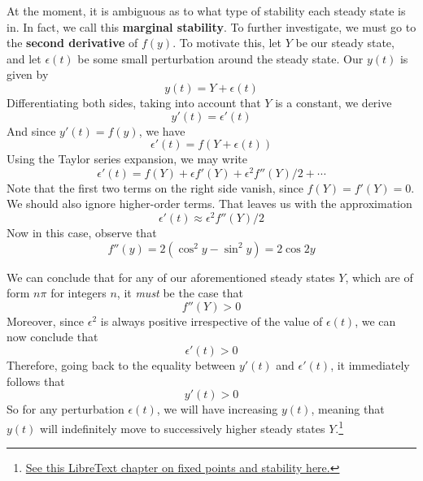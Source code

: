 \documentclass[a4paper]{article}
\begin{document}
At the moment, it is ambiguous as to what type of stability each steady state is in. In fact, we call this \textbf{marginal stability}. To further investigate, we must go to the \textbf{second derivative} of \(f \!\left( y \right) \). To motivate this, let \(Y\) be our steady state, and let \(\epsilon \!\left( t \right) \) be some small perturbation around the steady state. Our \(y \!\left( t \right) \) is given by
\[
	y \!\left( t \right) = Y + \epsilon \!\left( t \right) 
\]
Differentiating both sides, taking into account that \(Y\) is a constant, we derive
\[
	y' \!\left( t \right) = \epsilon' \!\left( t \right) 
\]
And since \(y' \!\left( t \right) = f \!\left( y \right) \), we have
\[
	\epsilon' \!\left( t \right) = f \!\left( Y + \epsilon \!\left( t \right)  \right) 
\]
Using the Taylor series expansion, we may write
\[
	\epsilon' \!\left( t \right) = f \!\left( Y \right) + \epsilon f' \!\left( Y \right) + \epsilon^{2} f'' \!\left( Y \right) / 2 + \cdots 
\]
Note that the first two terms on the right side vanish, since \(f \!\left( Y \right) = f' \!\left( Y \right) = 0\). We should also ignore higher-order terms. That leaves us with the approximation
\[
	\epsilon' \!\left( t \right) \approx \epsilon^{2} f'' \!\left( Y \right) /2
\]
Now in this case, observe that
\[
	f'' \!\left( y \right) = 2 \left( \cos^{2}y - \sin^{2}y \right) = 2 \cos 2y
\]

We can conclude that for any of our aforementioned steady states \(Y\), which are of form \(n \pi \) for integers \(n\), it \textit{must} be the case that
\[
	f''\!\left( Y \right) > 0
\]
Moreover, since \(\epsilon^{2}\) is always positive irrespective of the value of \(\epsilon \!\left( t \right) \), we can now conclude that
\[
	\epsilon' \!\left( t \right) > 0
\]
Therefore, going back to the equality between \(y'\!\left( t \right) \) and \(\epsilon' \!\left( t \right) \), it immediately follows that
\[
	y'\!\left( t \right) > 0
\]
So for any perturbation \(\epsilon \!\left( t \right) \), we will have increasing \(y \!\left( t \right) \), meaning that \(y \!\left( t \right) \) will indefinitely move to successively higher steady states \(Y\).\footnote{\href{https://math.libretexts.org/Bookshelves/Differential_Equations/Differential_Equations_(Chasnov)/08\%3A_Nonlinear_Differential_Equations/8.01\%3A_Fixed_Points_and_Stability}{See this LibreText chapter on fixed points and stability here.}}

\vspace{12pt}

\end{document}

